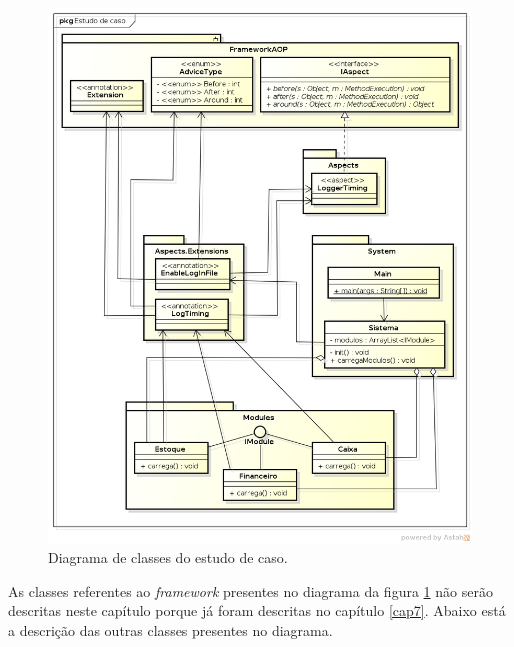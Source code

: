 \documentclass[tc,oneside]{iiufrgs}
\begin{document}
\begin{figure}[ht]
	\centering
	\includegraphics[scale=0.4]{diagramas/estudoCaso.png}
	\caption{Diagrama de classes do estudo de caso.}
	\label{fig:estudodiagrama}
\end{figure}

As classes referentes ao \textit{framework} presentes no diagrama da figura \ref{fig:estudodiagrama} não serão descritas neste capítulo porque já foram descritas no capítulo \ref{cap7}. Abaixo está a descrição das outras classes presentes no diagrama.
\end{document}
